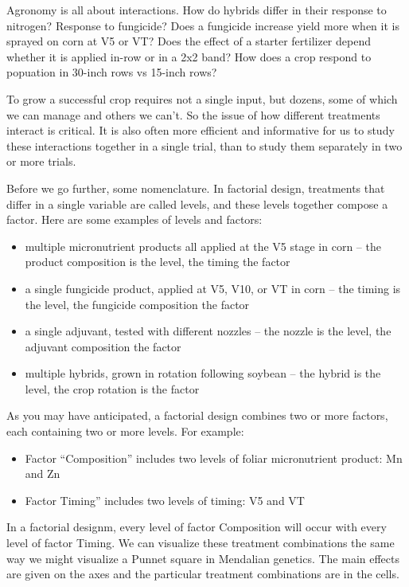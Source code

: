 \documentclass[
]{book}
\providecommand{\tightlist}{%
  \setlength{\itemsep}{0pt}\setlength{\parskip}{0pt}}
\begin{document}
Agronomy is all about interactions. How do hybrids differ in their response to nitrogen? Response to fungicide? Does a fungicide increase yield more when it is sprayed on corn at V5 or VT? Does the effect of a starter fertilizer depend whether it is applied in-row or in a 2x2 band? How does a crop respond to popuation in 30-inch rows vs 15-inch rows?

To grow a successful crop requires not a single input, but dozens, some of which we can manage and others we can't. So the issue of how different treatments interact is critical. It is also often more efficient and informative for us to study these interactions together in a single trial, than to study them separately in two or more trials.

Before we go further, some nomenclature. In factorial design, treatments that differ in a single variable are called levels, and these levels together compose a factor. Here are some examples of levels and factors:

\begin{itemize}
\tightlist
\item
  multiple micronutrient products all applied at the V5 stage in corn -- the product composition is the level, the timing the factor
\item
  a single fungicide product, applied at V5, V10, or VT in corn -- the timing is the level, the fungicide composition the factor
\item
  a single adjuvant, tested with different nozzles -- the nozzle is the level, the adjuvant composition the factor
\item
  multiple hybrids, grown in rotation following soybean -- the hybrid is the level, the crop rotation is the factor
\end{itemize}

As you may have anticipated, a factorial design combines two or more factors, each containing two or more levels. For example:

\begin{itemize}
\tightlist
\item
  Factor ``Composition'' includes two levels of foliar micronutrient product: Mn and Zn
\item
  Factor Timing'' includes two levels of timing: V5 and VT
\end{itemize}

In a factorial designm, every level of factor Composition will occur with every level of factor Timing. We can visualize these treatment combinations the same way we might visualize a Punnet square in Mendalian genetics. The main effects are given on the axes and the particular treatment combinations are in the cells.
\end{document}
